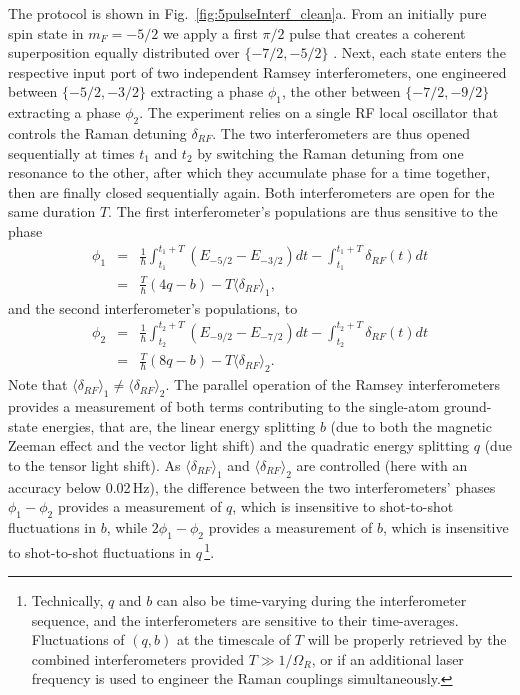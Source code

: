 The protocol is shown in Fig.~\ref{fig:5pulseInterf_clean}a. From an initially pure spin state in $m_F = -5/2$ we apply a first $\pi/2$ pulse that creates a coherent superposition equally distributed over $\{-7/2, -5/2\}$ \cite{notemixture}. Next, each state enters the respective input port of two independent Ramsey interferometers, one engineered between $\{-5/2, -3/2\}$ extracting a phase $\phi_1$, the other between $\{-7/2, -9/2\}$ extracting a phase $\phi_2$. The experiment relies on a single RF local oscillator that controls the Raman detuning $\delta_{RF}$. The two interferometers are thus opened sequentially at times $t_1$ and $t_2$ by switching the Raman detuning from one resonance to the other, after which they accumulate phase for a time together, then are finally closed sequentially again. Both interferometers are open for the same duration $T$. The first interferometer's populations are thus sensitive to the phase 
\begin{eqnarray}
   \phi_1 &=& \frac{1}{\hbar} \int_{t_1}^{t_1+T} \left( E_{-5/2} - E_{-3/2} \right) dt - \int_{t_1}^{t_1+T}  \delta_{RF}(t)  dt \nonumber \\
  ~ &=& \frac{T}{\hbar} (4 q - b) - T \langle \delta_{RF} \rangle_1, 
\end{eqnarray}
and the second interferometer's populations, to 
\begin{eqnarray}
   \phi_2 &=& \frac{1}{\hbar} \int_{t_2}^{t_2+T} \left( E_{-9/2} - E_{-7/2} \right) dt  - \int_{t_2}^{t_2+T}  \delta_{RF}(t) dt \nonumber \\
   ~&=& \frac{T}{\hbar} (8 q - b) - T \langle \delta_{RF} \rangle_2.
\end{eqnarray}
Note that $\langle \delta_{RF} \rangle_1 \neq \langle \delta_{RF} \rangle_2$.
The parallel operation of the Ramsey interferometers provides a measurement of both terms contributing to the single-atom ground-state energies, that are, the linear energy splitting $b$ (due to both the magnetic Zeeman effect and the vector light shift) and the quadratic energy splitting $q$ (due to the tensor light shift). As $\langle \delta_{RF} \rangle_1$ and $ \langle \delta_{RF} \rangle_2$ are controlled (here with an accuracy below 0.02\,Hz), the difference between the two interferometers' phases $\phi_1-\phi_2$ provides a measurement of $q$, which is insensitive to shot-to-shot fluctuations in $b$, while $2 \phi_1 - \phi_2$ provides a measurement of $b$, which is insensitive to shot-to-shot fluctuations in $q$\,\footnote{Technically, $q$ and $b$ can also be time-varying during the interferometer sequence, and the interferometers are sensitive to their time-averages. Fluctuations of $(q, b)$ at the timescale of $T$ will be properly retrieved by the combined interferometers provided $T \gg 1/\Omega_R$, or if an additional laser frequency is used to engineer the Raman couplings simultaneously.}. 

